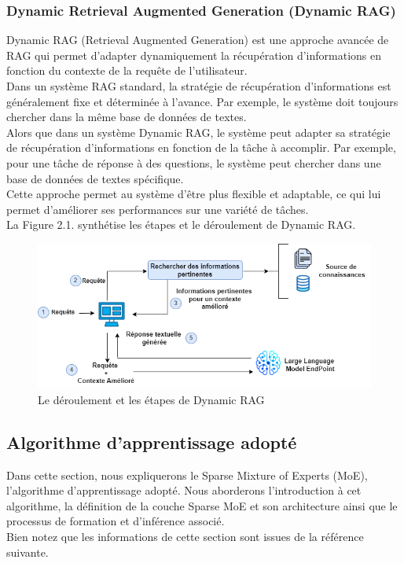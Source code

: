 \subsubsection{Dynamic Retrieval Augmented Generation (Dynamic RAG)}
\justifying
Dynamic RAG (Retrieval Augmented Generation) est une approche avancée de RAG qui permet d'adapter dynamiquement la récupération d'informations en fonction du contexte de la requête de l'utilisateur.\\
Dans un système RAG standard, la stratégie de récupération d'informations est généralement fixe et déterminée à l'avance. Par exemple, le système doit toujours chercher dans la même base de données de textes.\\
Alors que dans un système Dynamic RAG, le système peut adapter sa stratégie de récupération d'informations en fonction de la tâche à accomplir. Par exemple, pour une tâche de réponse à des questions, le système peut chercher dans une base de données de textes spécifique.\\
Cette approche permet au système d'être plus flexible et adaptable, ce qui lui permet d’améliorer ses performances sur une variété de tâches.\\
La Figure 2.1. synthétise les étapes et le déroulement  de Dynamic RAG.

\begin{figure}[H]
    \centering
    \includegraphics[width=\textwidth]{images/chp2/fig1.png}
   \caption{Le déroulement et les étapes de Dynamic RAG}
    \label{fig:deroulement dynamic rag}      
\end{figure}


\subsection{Algorithme d’apprentissage adopté}
\justifying
Dans cette section, nous expliquerons le Sparse Mixture of Experts (MoE), l’algorithme d’apprentissage adopté. Nous aborderons l'introduction à cet algorithme, la définition de la couche Sparse MoE et son architecture ainsi que le processus de formation et d'inférence associé.\\
Bien notez que les informations de cette section sont issues de la référence suivante. \cite{moe}

